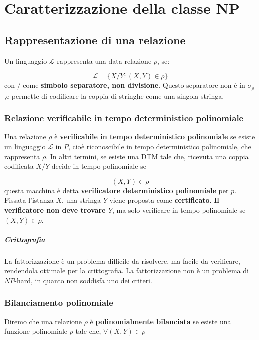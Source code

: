 \chapter{Caratterizzazione della classe NP}



\section{Rappresentazione di una relazione}

Un linguaggio $\mathcal{L}$ rappresenta una data relazione $\rho$, se:

$$
\mathcal L = \{X / Y : (X,Y) \in \rho\}
$$
con $/$ come \textbf{simbolo separatore, non divisione}. Questo separatore non è in $\sigma_\rho$,e  permette di codificare la coppia di stringhe come una singola stringa.

\subsection{Relazione verificabile in tempo deterministico polinomiale}
Una relazione $\rho$ è \textbf{verificabile in tempo deterministico polinomiale} se esiste un linguaggio $\mathcal L$ in $P$, cioè riconoscibile in tempo deterministico polinomiale, che rappresenta $\rho$. In altri termini, se esiste una DTM tale che, ricevuta una coppia codificata $X/Y$ decide in tempo polinomiale se 

$$
(X,Y) \in \rho
$$
%
questa macchina è detta \textbf{verificatore deterministico polinomiale} per $p$. Fissata l'istanza $X$, una stringa $Y$ viene proposta come \textbf{certificato}. \textbf{Il verificatore non deve trovare $Y$}, ma solo verificare in tempo polinomiale se $(X, Y) \in \rho$.

\paragraph{Crittografia}
La fattorizzazione è un problema difficile da risolvere, ma facile da verificare, rendendola ottimale per la crittografia. La fattorizzazione non è un problema di $NP$-hard, in quanto non soddisfa uno dei criteri. 

\subsection{Bilanciamento polinomiale}
Diremo che una relazione $\rho$ è \textbf{polinomialmente bilanciata} se esiste una funzione polinomiale $p$ tale che, $\forall (X,Y) \in \rho$ 

